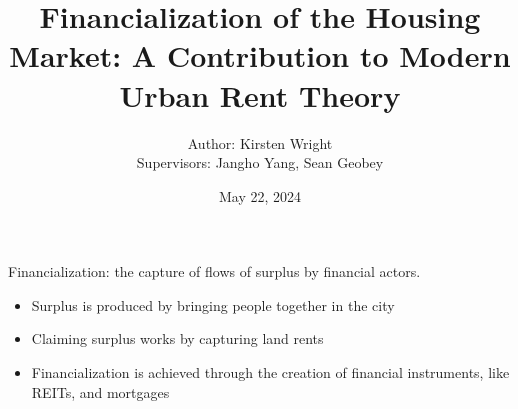 \documentclass[]{beamer} %
\title{ Financialization of the Housing Market: A Contribution to Modern Urban Rent Theory}
\author{
  Author: Kirsten Wright \\
  Supervisors: Jangho Yang, Sean Geobey
}
\institute{SYDE Graduate Seminar \\[1ex] University of Waterloo}
\date{May 22, 2024}
\begin{document}
{
    \maketitle   
}


\begin{frame}{Financialization: 
the capture of flows of surplus by financial actors.}
\begin{itemize} \Large 
    \item Surplus is produced by bringing people together in the city 
    \item Claiming surplus works by capturing land rents %
    \item Financialization is achieved through the creation of financial instruments, like REITs, and mortgages 
\end{itemize}

\end{frame}

\begin{frame}
\begin{figure}[!ht]
\centering
\resizebox{0.85\textwidth}{!}{}
\label{fig:fieldsplus}
\end{figure}
\end{frame}
\end{document}

